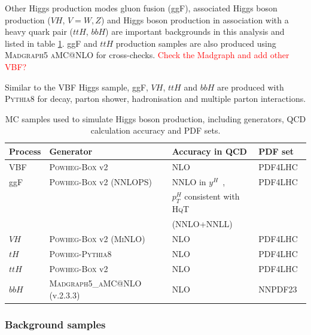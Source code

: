 Other Higgs production modes gluon fusion (ggF), associated Higgs boson production ($VH$, $V=W,Z$) and Higgs boson production in association with a heavy quark pair ($ttH$, $bbH$) are important backgrounds in this analysis and listed in table \ref{tab:samples}. ggF and $ttH$ production samples are also produced using \textsc{Madgraph5 aMC@NLO} for cross-checks. \textcolor{red}{Check the Madgraph and add other VBF?} 

Similar to the VBF Higgs sample, ggF, $VH$, $ttH$ and $bbH$ are produced with \textsc{Pythia8}\cite{pythia,Sjostrand:2007gs} for decay, parton shower, hadronisation and multiple parton interactions.

\begin{table}[tb]
\caption{MC samples used to simulate Higgs boson production, including generators, QCD calculation accuracy and PDF sets.}
\label{tab:samples}
\centering
\begin{tabular}{ llll}
  \hline
  \hline
  Process & Generator & Accuracy in QCD & PDF set   \\
  \hline
   VBF & \textsc{Powheg-Box} v2~\cite{powheg1,powheg2,powheg3,powheg5}  & NLO & PDF4LHC~\cite{Butterworth:2015oua} \\
 \hline 
  ggF & \textsc{Powheg-Box} v2 (NNLOPS)~\cite{powheg1,powheg2,powheg3,Campbell:2012am} & NNLO in $y^{H}$~\cite{Hamilton:2013fea}, & PDF4LHC~\cite{Butterworth:2015oua}  \\
  & & $p_{T}^{H}$ consistent with \textsc{HqT}  & \\
  & & (NNLO+NNLL)~\cite{Bozzi:2005wk,deFlorian:2011xf} & \\  
  $VH$ & \textsc{Powheg-Box} v2 (\textsc{MiNLO})~\cite{powheg1,powheg2,powheg3,Luisoni:2013kna} & NLO & PDF4LHC~\cite{Butterworth:2015oua} \\
  $tH$ & \textsc{Powheg-Pythia8} & NLO & PDF4LHC~\cite{Butterworth:2015oua} \\
  $ttH$ & \textsc{Powheg-Box} v2~\cite{powheg1,powheg2,powheg3,powheg5} & NLO & PDF4LHC~\cite{Butterworth:2015oua} \\
  $bbH$ & \textsc{Madgraph5\_aMC@NLO} (v.2.3.3)~\cite{Alwall:2014hca,Wiesemann:2014ioa} & NLO & NNPDF23~\cite{Ball:2012cx} \\
\hline
\hline
\end{tabular}
\end{table}
 
\subsubsection{Background samples}
\label{sec:bkgMC}


